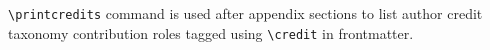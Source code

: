 \documentclass[a4paper,fleqn]{cas-dc}
\begin{document}
\verb+\printcredits+ command is used after appendix sections to list 
author credit taxonomy contribution roles tagged using \verb+\credit+ 
in frontmatter.

\printcredits

%







\end{document}
